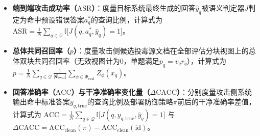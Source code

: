 \begin{itemize}[leftmargin=2em,itemsep=2pt]
  \item \textbf{端到端攻击成功率（$\mathrm{ASR}$）}：度量目标系统最终生成的回答$\hat y_q$被语义判定器$J$判定为命中预设错误答案$a_q^*$的查询比例，计算式为 $\mathrm{ASR}=\frac{1}{N}\sum_{q\in\mathcal Q}\mathbb I\big[J(q,a_q^*,\hat y_q)=1\big]$。
  \item \textbf{总体共同召回率（$p$）}：度量攻击侧候选投毒源文档在全部评估分块视图上的总体双块共同召回率（无效视图计为$0$，单题满足$p_q=v_q r_q$），计算式为 $p=\frac{1}{N}\sum_{q\in\mathcal Q}\frac{1}{|\Phi_{\mathrm{eval}}|}\sum_{\phi\in\Phi_{\mathrm{eval}}}Z_\phi(x_q)$。
  \item \textbf{回答准确率（$\mathrm{ACC}$）与干净准确率变化量（$\Delta\mathrm{CACC}$）}：分别度量攻击侧系统输出命中标准答案$y_{q,\mathrm{true}}$的查询比例及部署防御策略$\pi$前后的干净准确率差值，计算式为 $\mathrm{ACC}=\frac{1}{N}\sum_{q\in\mathcal Q}\mathbb I\big[J(q,y_{q,\mathrm{true}},\hat y_q)=1\big]$ 与 $\Delta\mathrm{CACC}=\mathrm{ACC}_{\mathrm{clean}}(\pi)-\mathrm{ACC}_{\mathrm{clean}}(\mathrm{id})$。

\end{itemize}
